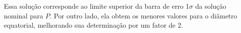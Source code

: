 \documentclass[12pt,a4paper]{monografia}
\begin{document}
Essa solução corresponde ao limite superior da barra de erro 1$\sigma$ da solução nominal para $P$. Por outro lado, ela obtem os menores valores para o diâmetro equatorial, melhorando sua determinação por um fator de 2.

\begin{figure}[h]
\begin{centering}

\end{centering}
\end{figure}
\end{document}
